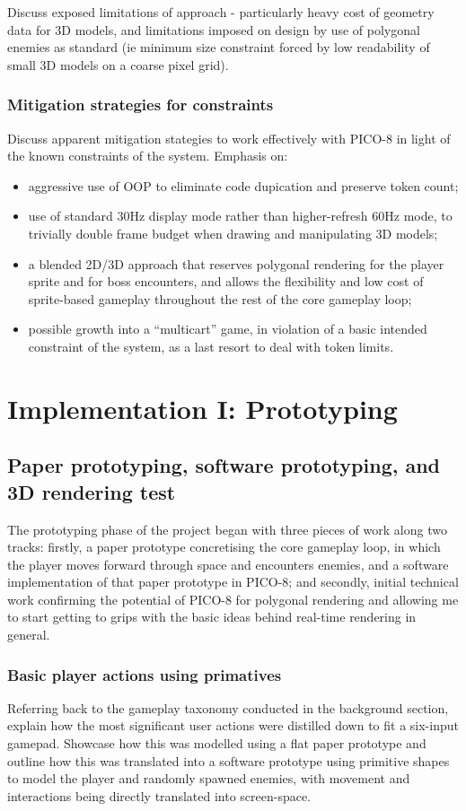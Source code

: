 \documentclass{article}
\begin{document}
Discuss exposed limitations of approach - particularly heavy cost of geometry data
for 3D models, and limitations imposed on design by use of polygonal enemies as
standard (ie minimum size constraint forced by low readability of small 3D models
on a coarse pixel grid).

\subsubsection*{Mitigation strategies for constraints}
Discuss apparent mitigation stategies to work effectively with PICO-8 in light of
the known constraints of the system. Emphasis on:
\begin{itemize}
   \item aggressive use of OOP to eliminate code dupication and preserve token count;
   \item use of standard 30Hz display mode rather than higher-refresh 60Hz mode, to
   trivially double frame budget when drawing and manipulating 3D models;
   \item a blended 2D/3D approach that reserves polygonal rendering for the player
   sprite and for boss encounters, and allows the flexibility and low cost of
   sprite-based gameplay throughout the rest of the core gameplay loop;
   \item possible growth into a ``multicart'' game, in violation of a basic intended
   constraint of the system, as a last resort to deal with token limits.
\end{itemize}


\section{Implementation I: Prototyping}

\subsection{Paper prototyping, software prototyping, and 3D rendering test}
The prototyping phase of the project began with three pieces of work along two tracks: firstly,
a paper prototype concretising the core gameplay loop, in which the player moves forward through
space and encounters enemies, and a software implementation of that paper prototype in PICO-8; and
secondly, initial technical work confirming the potential of PICO-8 for polygonal rendering and
allowing me to start getting to grips with the basic ideas behind real-time rendering in general.
\subsubsection*{Basic player actions using primatives}
Referring back to the gameplay taxonomy conducted in the background section, explain
how the most significant user actions were distilled down to fit a six-input
gamepad. Showcase how this was modelled using a flat paper prototype and outline
how this was translated into a software prototype using primitive shapes to model
the player and randomly spawned enemies, with movement and interactions being
directly translated into screen-space.
\end{document}
